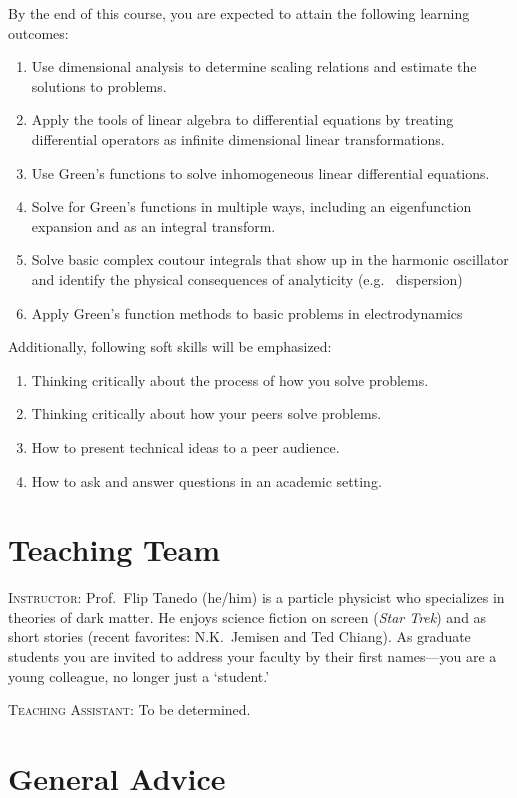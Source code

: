 \documentclass[12pt]{article}
\numberwithin{equation}{section}    %
\begin{document}
By the end of this course, you are expected to attain the following learning outcomes:
\begin{enumerate}
	\item Use dimensional analysis to determine scaling relations and estimate the solutions to problems.
	\item Apply the tools of linear algebra to differential equations by treating differential operators as infinite dimensional linear transformations.
	\item Use Green's functions to solve inhomogeneous linear differential equations.
	\item Solve for Green's functions in multiple ways, including an eigenfunction expansion and as an integral transform.
	\item Solve basic complex coutour integrals that show up in the harmonic oscillator and identify the physical consequences of analyticity (e.g.~ dispersion)
	\item Apply Green's function methods to basic problems in electrodynamics
\end{enumerate}
Additionally, following soft skills will be emphasized:
\begin{enumerate}
	\item Thinking critically about the process of how you solve problems.
	\item Thinking critically about how your peers solve problems.
	\item How to present technical ideas to a peer audience.
	\item How to ask and answer questions in an academic setting.
\end{enumerate}

\section*{Teaching Team}

\noindent \textsc{Instructor}: Prof.~Flip Tanedo (he/him) is a particle physicist who specializes in theories of dark matter. He enjoys science fiction on screen (\emph{Star Trek}) and as short stories (recent favorites: N.K.~Jemisen and Ted Chiang). As graduate students you are invited to address your faculty by their first names---you are a young colleague, no longer just a `student.' 

\vspace{.5em}
\noindent \textsc{Teaching Assistant}: To be determined.

\section*{General Advice}
\end{document}
